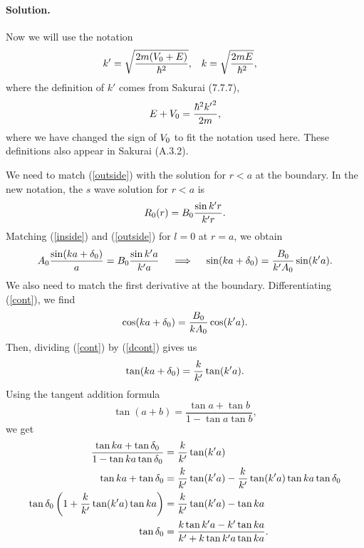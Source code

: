 \documentclass[11pt]{article}
\newcommand{\refeq}[1]{(\ref{#1})}
\newcommand{\beq}{\begin{equation*}}
\newcommand{\eeq}{\end{equation*}}
\newcommand{\beqn}{\begin{equation}}
\newcommand{\eeqn}{\end{equation}}
\newenvironment{solution}
{
	\paragraph{Solution.}
}
{
	\bigskip
}
\newcommand{\qimplies}{\quad \implies \quad}
\begin{document}
\begin{solution}
	Now we will use the notation
	\begin{align} \label{kk}
		k' &= \sqrt{\frac{2m (V_0 + E)}{\hbar^2}}, &
		k &= \sqrt{\frac{2m E}{\hbar^2}},
	\end{align}
	where the definition of $k'$ comes from Sakurai (7.7.7),
	\beq
		E + \Vo = \frac{\hbar^2 {k'}^2}{2 m},
	\eeq
	where we have changed the sign of $V_0$ to fit the notation used here.  These definitions also appear in Sakurai (A.3.2).
	
	We need to match \refeq{outside} with the solution for $r < a$ at the boundary.  In the new notation, the $s$ wave solution for $r < a$ is
	\beqn \label{inside}
		\Ro(r) = \Bo \frac{\sin k' r}{k' r}.
	\eeqn
	Matching \refeq{inside} and \refeq{outside} for $l = 0$ at $r = a$, we obtain
	\beqn \label{cont}
		\Ao \frac{\sin(ka + \delo)}{a} = \Bo \frac{\sin k' a}{k' a}
		\qimplies
		\sin(ka + \delo) = \frac{\Bo}{k' \Ao} \sin(k' a).
	\eeqn
	We also need to match the first derivative at the boundary.  Differentiating \refeq{cont}, we find
	\beqn \label{dcont}
		\cos(ka + \delo) = \frac{\Bo}{k \Ao} \cos(k' a).
	\eeqn
	Then, dividing \refeq{cont} by \refeq{dcont} gives us
	\beq
		\tan(ka + \delo) = \frac{k}{k'} \tan(k' a).
	\eeq
	Using the tangent addition formula
	\beq
		\tan(a + b) = \frac{\tan a + \tan b}{1 - \tan a \tan b},
	\eeq
	we get
	\begin{align}
		\frac{\tan ka + \tan \delta_0}{1 - \tan ka \tan \delta_0} &= \frac{k}{k'} \tan(k' a) \notag \\
		\tan ka + \tan \delta_0 &= \frac{k}{k'} \tan(k' a) - \frac{k}{k'} \tan(k' a) \tan ka \tan \delta_0 \notag \\
		\tan \delta_0 \left( 1 + \frac{k}{k'} \tan(k' a) \tan ka \right) &= \frac{k}{k'} \tan(k' a) - \tan ka \notag \\
		\tan \delta_0 &= \frac{k \tan k' a - k' \tan ka}{k' + k \tan k' a \tan ka}. \label{delo}
	\end{align}
	

\end{solution}
\end{document}
